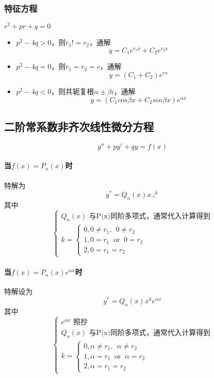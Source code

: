 \subsubsection{特征方程}
\(r^2 + pr + q = 0\)
\begin{itemize}
    \item \(p^2 - 4q > 0\)，则\(r_1 != r_2\)，通解\[y = C_1e^{r_1x} + C_2e^{r_2x}\]
    \item \(p^2 - 4q = 0\)，则\(r_1 = r_2 = r\)，通解\[y = (C_1 + C_2)e^{rx}\]
    \item \(p^2 - 4q < 0\)，则共轭复根\(\alpha \pm \beta i\)，通解\[y = (C_1cos\beta x + C_2sin\beta x)e^{\alpha x}\]
\end{itemize}


\subsection{二阶常系数非齐次线性微分方程}
\[y'' + py' + qy = f(x)\]


\paragraph{当\(f(x) = P_n(x)\)时}
特解为\[y^* = Q_n(x)x.;^k\]其中
\[\begin{cases}
    Q_n(x)\text{ 与P(x)同阶多项式，通常代入计算得到} \\
    k = \begin{cases}
        0, 0 \neq r_1,\ \ 0 \neq r_2 \\ 
        1, 0 = r_1\ \text{ or }\ 0 = r_2 \\ 
        2, 0 = r_1 = r_2
    \end{cases}
\end{cases}\]

\paragraph{当\(f(x) = P_n(x)e^{\alpha x}\)时}
特解设为
\[y^* = Q_n(x)x^ke^{\alpha x}\]其中
\[\begin{cases}
    e^{\alpha x}\text{ 照抄} \\
    Q_n(x)\text{ 与P(x)同阶多项式，通常代入计算得到} \\
    k = \begin{cases}
        0, \alpha \neq r_1,\ \ \alpha \neq r_2 \\ 
        1, \alpha = r_1\ \text{ or }\ \alpha = r_2 \\ 
        2, \alpha = r_1 = r_2
    \end{cases}
\end{cases}\]

